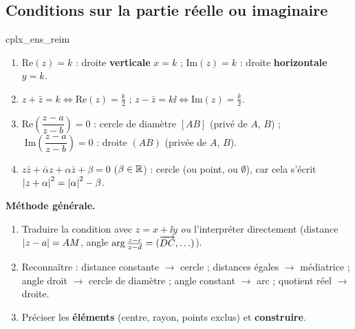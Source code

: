 \subsection{Conditions sur la partie réelle ou imaginaire}

\begin{propriete}{}{cplx_ens_reim}
	\begin{enumerate}
		\item $\mathrm{Re}(z) = k$ : droite \textbf{verticale} $x = k$ ;
		\quad $\mathrm{Im}(z) = k$ : droite \textbf{horizontale} $y = k$.
		\item $z + \bar z = k \iff \mathrm{Re}(z) = \frac{k}{2}$ ;
		\quad $z - \bar z = k\ii \iff \mathrm{Im}(z) = \frac{k}{2}$.
		\item $\mathrm{Re}\!\left(\dfrac{z - a}{z - b}\right) = 0$ : cercle de
		diamètre $[AB]$ (privé de $A$, $B$) ;
		$\;\mathrm{Im}\!\left(\dfrac{z - a}{z - b}\right) = 0$ : droite $(AB)$
		(privée de $A$, $B$).
		\item $z\bar z + \bar\alpha z + \alpha\bar z + \beta = 0$
		($\beta \in \mathbb{R}$) : cercle (ou point, ou $\emptyset$), car cela s'écrit
		$\left|z + \alpha\right|^2 = \left|\alpha\right|^2 - \beta$.
	\end{enumerate}
\end{propriete}

\begin{astucebac}
	\textbf{Méthode générale.}
	\begin{enumerate}
		\item Traduire la condition avec $z = x + \ii y$ \emph{ou} l'interpréter
		directement (distance $\left|z - a\right| = AM$, angle
		$\arg\frac{z-c}{z-d} = (\overrightarrow{DC},\ldots)$).
		\item Reconnaître : distance constante $\to$ cercle ; distances égales
		$\to$ médiatrice ; angle droit $\to$ cercle de diamètre ; angle
		constant $\to$ arc ; quotient réel $\to$ droite.
		\item Préciser les \textbf{éléments} (centre, rayon, points exclus) et
		\textbf{construire}.
	\end{enumerate}
\end{astucebac}

